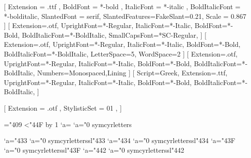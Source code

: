 % 
%
\setmainfont{serif}[
  Extension = .ttf ,
  BoldFont = *-bold ,
  ItalicFont = *-italic ,
  BoldItalicFont = *-bolditalic,
  SlantedFont = serif,
  SlantedFeatures={FakeSlant=0.21},
  Scale = 0.867
]
\setsansfont{AlegreyaSans}[
  Extension=.otf,
  UprightFont=*-Regular,
  ItalicFont=*-Italic,
  BoldFont=*-Bold,
  BoldItalicFont=*-BoldItalic,
  SmallCapsFont=*SC-Regular,
]
[
  Extension=.otf,
  UprightFont=*-Regular,
  ItalicFont=*-Italic,
  BoldFont=*-Bold,
  BoldItalicFont=*-BoldItalic,
  LetterSpace=5,
  WordSpace=2
]
[
  Extension=.otf,
  UprightFont=*-Regular,
  ItalicFont=*-Italic,
  BoldFont=*-Bold,
  BoldItalicFont=*-BoldItalic,
  Numbers={Monospaced,Lining}
]
[
  Script=Greek,
  Extension=.ttf,
  UprightFont=*-Regular,
  ItalicFont=*-Italic,
  BoldFont=*-Bold,
  BoldItalicFont=*-BoldItalic,
]

% 
%

\usepackage{unicode-math}

[%
  Extension = .otf ,
  StylisticSet = 01 ,
]

%
%



\newcommand{\makecyrmathletter}[1]{%
  \begingroup\lccode`a=#1\lowercase{\endgroup
  \Umathcode`a}="0 \csname symcyrletters\endcsname\space #1
}
="409
\loop\ifnum{}<"44F
  \advance{} by 1
  \makecyrmathletter{\count255}
\repeat


\newcommand{\makecyrmathlettersl}[1]{%
  \begingroup\lccode`a=#1\lowercase{\endgroup
  \Umathcode`a}="0 \csname symcyrletterssl\endcsname\space #1
}
\makecyrmathlettersl{"433} %
\makecyrmathlettersl{"434} %
\makecyrmathlettersl{"43F} %
\makecyrmathlettersl{"442} %
